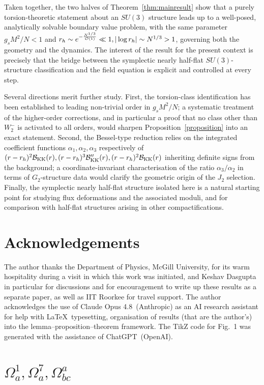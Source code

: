 \documentclass[a4paper,11pt,fleqn]{article}
\makeatletter
\theoremstyle{plain}
\theoremstyle{definition}
\def\seceqaa{\@addtoreset{equation}{section}
\def\theequation{A\arabic{equation}}}
\newcommand{\anu}{\alpha_1}
\newcommand{\ade}{\alpha_2}
\newcommand{\ath}{\alpha_3}
\makeatother
\begin{document}
Taken together, the two halves of Theorem~\ref{thm:mainresult} show that a purely
torsion-theoretic statement about an $SU(3)$ structure leads up to a well-posed,
analytically solvable boundary value problem, with the same  parameter $g_s M^2/N<1$ and $r_h\sim e^{-\frac{N^{1/3}}{{\cal O}(1)}}\ll1, |\log r_h|\sim N^{1/3}>1$, governing both the geometry and the dynamics. The interest of the result for the present
context is precisely that the bridge between the symplectic nearly half-flat $SU(3)$-structure classification and the field equation is explicit and controlled at every step.

Several directions merit further study. First, the torsion-class identification has been
established to leading non-trivial order in $g_s M^2/N$; a systematic treatment of the
higher-order corrections, and in particular a proof that no class other than $W_2^-$ is
activated to all orders, would sharpen Proposition~\ref{proposition} into an exact statement. Second, the Bessel-type reduction relies on the integrated coefficient functions $\anu,\ade,\ath$ respectively of $(r - r_h)^2{\cal B}_{\rm KK}(r), (r - r_h)^3{\cal B}''_{\rm KK}(r), (r - r_h)^2{\cal B}_{\rm KK}(r)$ inheriting definite signs from the background; a coordinate-invariant characterisation of the ratio $\ath/\ade$ in terms of $G_2$-structure data would
clarify the geometric origin of the $J_2$ selection. Finally, the symplectic nearly half-flat
structure isolated here is a natural starting point for studying flux deformations and the
associated moduli, and for comparison with half-flat structures arising in other
compactifications. 

\section*{Acknowledgements}

The author thanks the Department of Physics, McGill University, for its warm hospitality during a visit in which this work was initiated, and Keshav Dasgupta in particular for  discussions and for encouragement to write up these results as a separate paper, as well as IIT Roorkee for travel support. The author acknowledges the use of Claude Opus 4.8~(Anthropic) as an AI research assistant for help with \LaTeX\ typesetting, organisation of results (that are the author's) into the lemma--proposition--theorem framework. The \textsf{TikZ} code for Fig.~1 was generated with the assistance of ChatGPT~(OpenAI). 

\appendix
\section{$\Omega^1_a, \Omega^7_a, \Omega^a_{bc}$}
\label{Omegas}
\setcounter{equation}{0} \seceqaa
\end{document}
